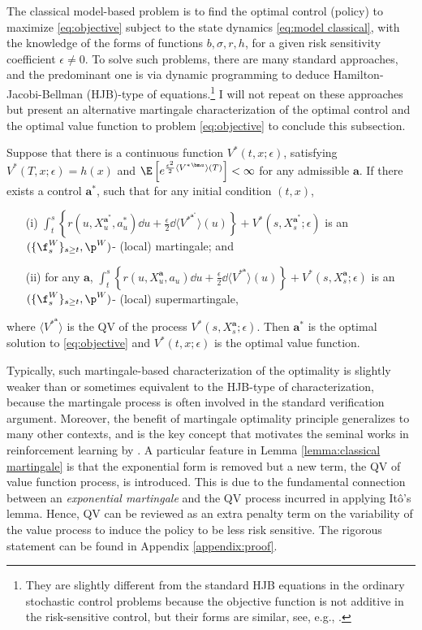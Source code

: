 The classical model-based problem is to find the optimal control (policy) to maximize \eqref{eq:objective} subject to the state dynamics \eqref{eq:model classical}, with the knowledge of the forms of functions $b,\sigma,r,h$, for a given risk sensitivity coefficient $\epsilon\neq 0$. To solve such problems, there are many standard approaches, and the predominant one is via dynamic programming to deduce Hamilton-Jacobi-Bellman (HJB)-type of equations.\footnote{They are slightly different from the standard HJB equations in the ordinary stochastic control problems because the objective function is not additive in the risk-sensitive control, but their forms are similar, see, e.g., \cite{nagai1996bellman}.} I will not repeat on these approaches but present an alternative martingale characterization of the optimal control and the optimal value function to problem \eqref{eq:objective} to conclude this subsection. 

\begin{lemma}
	\label{lemma:classical martingale}
	Suppose that there is a continuous function $V^*(t,x;\epsilon)$, satisfying $V^*(T,x;\epsilon) = h(x)$ and $\E\left[ e^{\frac{\epsilon^2}{2} \langle {V^*}^{\bm a}\rangle(T) }  \right] < \infty$ for any admissible $\bm a$. If there exists a control $\bm a^* $, such that for any initial condition $(t,x)$,
	\begin{enumerate}
		\item[(i)] $ \int_t^s \left\{ r(u, X_{u}^{\bm a^*}, a_{u}^*)\dd u + \frac{\epsilon}{2} \dd \langle  V^{*^{\bm a^*}} \rangle(u)\right\} + V^*(s, X_s^{\bm a^*};\epsilon) $ is an $( \{\f_s^W\}_{s\geq t},\p^W)$- (local) martingale; and
		\item[(ii)] for any $\bm a$, $ \int_t^s \left\{ r(u, X_{u}^{\bm a}, a_{u})\dd u + \frac{\epsilon}{2} \dd \langle  V^{*^{\bm a}} \rangle(u)\right\}  + V^*(s, X_s^{\bm a};\epsilon) $ is an $(\{\f_s^W\}_{s\geq t},\p^W)$- (local) supermartingale,
	\end{enumerate}
	where $\langle V^{*^{\bm a}} \rangle$ is the QV of the process $V^{*}(s, X_s^{\bm a};\epsilon)$. Then $\bm a^*$ is the optimal solution to \eqref{eq:objective} and $V^*(t,x;\epsilon)$ is the optimal value function.
\end{lemma}


Typically, such martingale-based characterization of the optimality is slightly weaker than or sometimes equivalent to the HJB-type of characterization, because the martingale process is often involved in the standard verification argument. Moreover, the benefit of martingale optimality principle generalizes to many other contexts, and is the key concept that motivates the seminal works in reinforcement learning by \citet{jia2022policy,jia2022policypg,jia2022q}. A particular feature in Lemma \ref{lemma:classical martingale} is that the exponential form is removed but a new term, the QV of value function process, is introduced. This is due to the fundamental connection between an \textit{exponential martingale} and the QV process incurred in applying It\^o's lemma. Hence, QV can be reviewed as an extra penalty term on the variability of the value process to induce the policy to be less risk sensitive. The rigorous statement can be found in Appendix \ref{appendix:proof}. 


